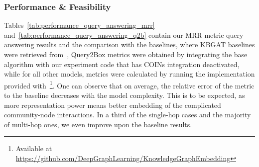 
\subsubsection{Performance \& Feasibility}

Tables~\ref{tab:performance_query_answering_mrr} and~\ref{tab:performance_query_answering_q2b} contain our MRR metric query answering results and the comparison with the baselines, where KBGAT baselines were retrieved from~\cite{nathani_learning_2019}, Query2Box metrics were obtained by integrating the base algorithm with our experiment code that has COINs integration deactivated, while for all other models, metrics were calculated by running the implementation provided with~\cite{sun_rotate_2019}\footnote{Available at \url{https://github.com/DeepGraphLearning/KnowledgeGraphEmbedding}}. 
One can observe that on average, the relative error of the metric to the baseline decreases with the model complexity. This is to be expected, as more representation power means better embedding of the complicated community-node interactions. In a third of the single-hop cases and the majority of multi-hop ones, we even improve upon the baseline results.

